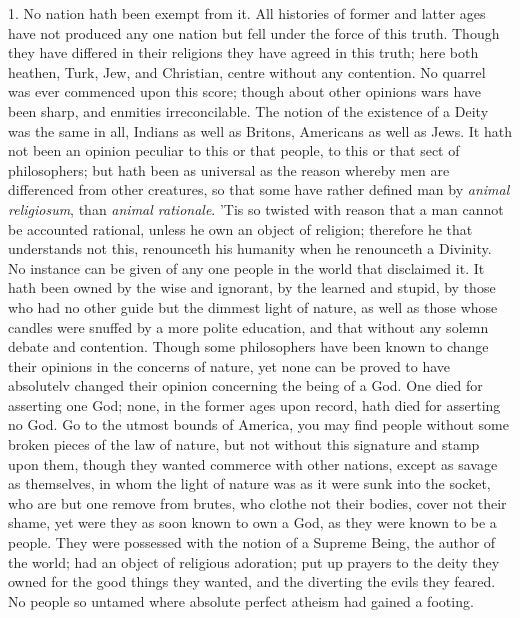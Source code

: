\documentclass[a5paper]{book}
\begin{document}
1. No nation hath been exempt from it. 
    All histories of former and latter ages have not produced 
    any one nation but fell under the force of this truth. 
Though they have differed in their religions they have agreed in this truth; 
    here both heathen, Turk, Jew, and Christian, 
    centre without any contention. 
No quarrel was ever commenced upon this score; 
    though about other opinions wars have been sharp, 
    and enmities irreconcilable. 
The notion of the existence of a Deity was the same in all, 
    Indians as well as Britons, 
    Americans as well as Jews. 
It hath not been an opinion peculiar to this or that people, 
    to this or that sect of philosophers; 
    but hath been as universal as the reason whereby men are 
    differenced from other creatures,
    so that some have rather defined man by \emph{animal religiosum}, 
    than \emph{animal rationale}. 
’Tis so twisted with reason that a man cannot be accounted rational, 
    unless he own an object of religion; 
    therefore he that understands not this, 
    renounceth his humanity when he renounceth a Divinity. 
No instance can be given of any one people in the world that disclaimed it. 
It hath been owned by the wise and ignorant, 
    by the learned and stupid, 
    by those who had no other guide but the dimmest light of nature, 
    as well as those whose candles were snuffed by a more polite education, 
    and that without any solemn debate and contention. 
Though some philosophers have been known to change their opinions 
    in the concerns of nature, 
    yet none can be proved to have absolutelv changed their opinion 
    concerning the being of a God. 
One died for asserting one God; 
    none, in the former ages upon record, hath died for asserting no God. 
Go to the utmost bounds of America, 
    you may find people without some broken pieces of the law of nature, 
    but not without this signature and stamp upon them, 
    though they wanted commerce with other nations,
    except as savage as themselves, 
    in whom the light of nature was as it were sunk into the socket, 
    who are but one remove from brutes,
    who clothe not their bodies, cover not their shame, 
    yet were they as soon known to own a God, as they were known to be a people.
They were possessed with the notion of a Supreme Being, 
    the author of the world; 
    had an object of religious adoration; 
    put up prayers to the deity they owned for the good things they wanted, 
    and the diverting the evils they feared. 
No people so untamed where absolute perfect atheism had gained a footing. 
\end{document}
